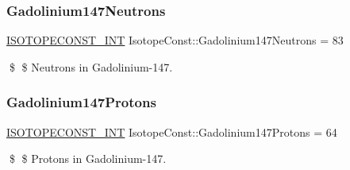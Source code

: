 \subsubsection{\texorpdfstring{Gadolinium147\+Neutrons}{Gadolinium147Neutrons}}
{\footnotesize\ttfamily \mbox{\hyperlink{group___isotope_const-_macros_ga5f18360b3e99483a35c32d789e62621c}{I\+S\+O\+T\+O\+P\+E\+C\+O\+N\+S\+T\+\_\+\+I\+NT}} Isotope\+Const\+::\+Gadolinium147\+Neutrons = 83}

\$ \$ Neutrons in Gadolinium-\/147. \mbox{\label{group___isotope_const-_gadolinium-_gd147_ga2a51923652403c8141613e8799838635}} 
\subsubsection{\texorpdfstring{Gadolinium147\+Protons}{Gadolinium147Protons}}
{\footnotesize\ttfamily \mbox{\hyperlink{group___isotope_const-_macros_ga5f18360b3e99483a35c32d789e62621c}{I\+S\+O\+T\+O\+P\+E\+C\+O\+N\+S\+T\+\_\+\+I\+NT}} Isotope\+Const\+::\+Gadolinium147\+Protons = 64}

\$ \$ Protons in Gadolinium-\/147. 